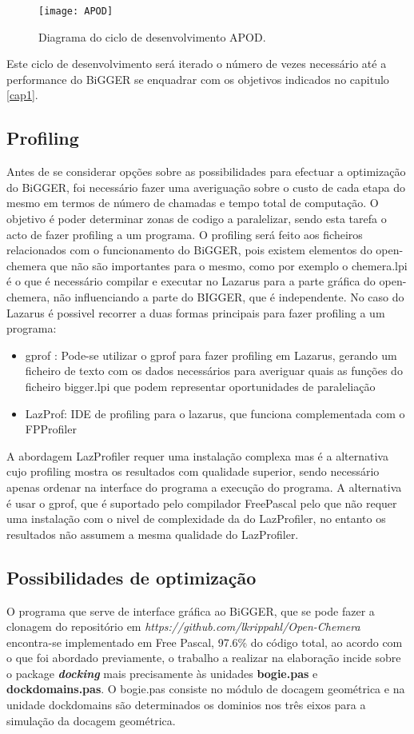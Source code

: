      \begin{figure}[ht]
  \centering
    {\texttt{[image: APOD]}}
  \caption{ Diagrama do ciclo de desenvolvimento APOD\cite{cudaProgGuide}.}
  \label{apodFig}
\end{figure}

Este ciclo de desenvolvimento será iterado o número de vezes necessário até a performance do BiGGER se enquadrar com os objetivos indicados no capitulo \ref{cap1}.
\subsection {Profiling}
\label{profiling}
Antes de se considerar opções sobre as possibilidades para efectuar a optimização do BiGGER, foi necessário fazer uma averiguação sobre o custo de cada etapa do mesmo em termos de número de chamadas e tempo total de computação. O objetivo é poder determinar zonas de codigo a paralelizar, sendo esta tarefa o acto de fazer profiling a um programa. O profiling será feito aos ficheiros relacionados com o funcionamento do BiGGER, pois existem elementos do open-chemera que não são importantes para o mesmo, como por exemplo o chemera.lpi é o que é necessário compilar e executar no Lazarus para a parte gráfica do open-chemera, não influenciando a parte do BIGGER, que é independente.  No caso do Lazarus é possivel recorrer a duas formas principais para fazer profiling a um programa\cite{lazProf}:
\begin{itemize}
\item gprof : Pode-se utilizar o gprof para fazer profiling em Lazarus, gerando um ficheiro de texto com os dados necessários para averiguar quais as funções do ficheiro bigger.lpi que podem representar oportunidades de paraleliação 
\item LazProf: IDE de profiling para o lazarus, que funciona complementada com o FPProfiler 
\end{itemize}  

 A abordagem LazProfiler requer uma instalação complexa mas é a alternativa cujo profiling mostra os resultados com qualidade superior, sendo necessário apenas ordenar na interface do programa a execução do programa. A alternativa é usar o gprof, que é suportado pelo compilador FreePascal pelo que não requer uma instalação com o nivel de complexidade da do LazProfiler, no entanto os resultados não assumem a mesma qualidade do LazProfiler.
\subsection{Possibilidades de optimização} %
\label{abordagem}
O programa que serve de interface gráfica ao BiGGER, que se pode fazer a clonagem do repositório em \textit{https://github.com/lkrippahl/Open-Chemera} encontra-se implementado em Free Pascal, 97.6\% do código total, ao acordo com o que foi abordado previamente, o trabalho a realizar na elaboração incide sobre o package \textbf{\textit{docking}} mais precisamente às unidades \textbf{bogie.pas} e \textbf{dockdomains.pas}. O bogie.pas consiste no módulo de docagem geométrica  e na unidade dockdomains são determinados os dominios nos três eixos para a simulação da docagem geométrica.

